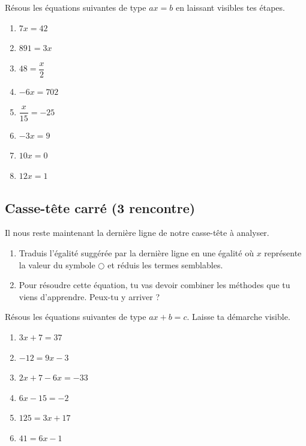 \documentclass[../math2.tex]{subfiles}
\begin{document}
\begin{exercise}
  Résous les équations suivantes de type $ax = b$ en laissant visibles
  tes étapes.
  \begin{enumerate}[cols=2, itemsep=3cm]
    \item $7x = 42$
    \item $891 = 3x$
    \item $48 = \dfrac{x}{2}$
    \item $- 6x = 702$
    \item $\dfrac{x}{15} = -25$
    \item $- 3x = 9$
    \item $10x = 0$
    \item $12x = 1$
  \end{enumerate}
  \vspace*{3cm}
\end{exercise}

\newpage
\subsection{Casse-tête carré (3\ieme{} rencontre)}

Il nous reste maintenant la dernière ligne de notre casse-tête à
analyser.
\begin{center}
  
\end{center}

\begin{enumerate}
  \item
        Traduis l'égalité suggérée par la dernière ligne en une égalité où
        $x$ représente la valeur du symbole $\bigcirc$ et réduis les termes semblables. \vspace*{2cm}
  \item Pour résoudre cette équation, tu vas devoir combiner les méthodes que tu viens d'apprendre. Peux-tu y arriver ?
        \vspace*{2cm}
\end{enumerate}%

\begin{exercise}
  Résous les équations suivantes de type $ax + b = c$. Laisse ta
  démarche visible.
  \begin{enumerate}[cols=2, itemsep=3cm]
    \item $3x + 7 = 37$
    \item $- 12 = 9x - 3$
    \item $2x + 7 - 6x = - 33$
    \item $6x - 15 = - 2$
    \item $125 = 3x + 17$
    \item $41 = 6x - 1$
  \end{enumerate}
  \vspace*{3cm}
\end{exercise}
\end{document}
